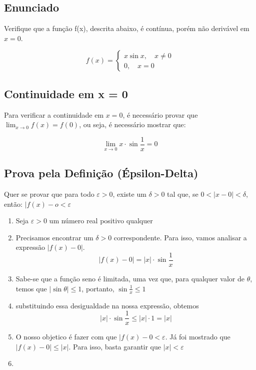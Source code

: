 

\subsection{Enunciado}

Verifique que a função f(x), descrita abaixo, é contínua, porém não derivável em $x = 0$.

\begin{equation*}
    f(x) = 
    \begin{cases}
        x\sin{x}, \quad x \neq 0 \\
        0, \quad x = 0
    \end{cases}
\end{equation*}

\subsection{Continuidade em x = 0}

Para verificar a continuidade em $x = 0$, é necessário provar que $\lim_{x\to0}f(x) = f(0)$, ou seja, 
é necessário mostrar que:

\begin{equation*}
    \lim_{x\to0}x\cdot\sin{\frac{1}{x}} = 0
\end{equation*}


\subsection{Prova pela Definição (Épsilon-Delta)}

Quer se provar que para todo $\varepsilon > 0$, existe um $\delta > 0$ tal que, se $0 < |x-0| < \delta$, então:
$|f(x) - o < \varepsilon$

\begin{enumerate}
    \item Seja $\varepsilon > 0$ um número real positivo qualquer
    \item Precisamos encontrar um $\delta > 0$ correspondente. Para isso, vamos analisar
    a expressão $|f(x) - 0|$.
    \[|f(x) - 0| = |x|\cdot\sin{\frac{1}{x}}\] 
    \item Sabe-se que a função seno é limitada, uma vez que, para qualquer
    valor de $\theta$, temos que $|\sin{\theta}| \leq 1$, portanto, $\sin{\frac{1}{x} \leq 1}$
    \item substituindo essa desigualdade na nossa expressão, obtemos
    \[|x|\cdot\sin{\frac{1}{x}} \leq |x|\cdot1 = |x|\]
    \item O nosso objetico é fazer com que $|f(x) - 0 < \varepsilon$. Já foi mostrado que
    $|f(x) - 0| \leq |x|$. Para isso, basta garantir que $|x| < \varepsilon$
    \item 
\end{enumerate}